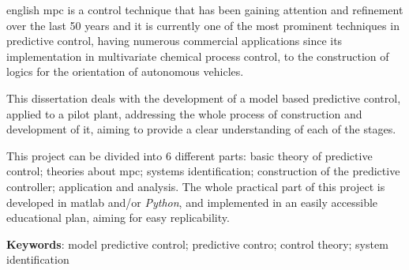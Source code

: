 \setlength{\absparsep}{18pt} %
\begin{resumo}[Abstract]
  \begin{otherlanguage*}{english}
    \acrshort{mpc} is a control technique that has been gaining attention and refinement over the last 50 years
    and it is currently one of the most prominent techniques in predictive control, having numerous
    commercial applications since its implementation in multivariate chemical process control,
    to the construction of logics for the orientation of autonomous vehicles.
    
    This dissertation deals with the development of a model based predictive control, applied
    to a pilot plant, addressing the whole process of construction and development of it,
    aiming to provide a clear understanding of each of the stages.
    
    This project can be divided into 6 different parts: basic theory of predictive control;
    theories about \acrshort{mpc}; systems identification; construction of the predictive controller;
    application and analysis. The whole practical part of this project is developed in \acrshort{matlab}
    and/or \textit{Python}, and implemented in an easily accessible educational plan, aiming for
    easy replicability.

    \vspace{\onelineskip}

    \noindent 
    \textbf{Keywords}: model predictive control; predictive contro; control theory; system identification
  \end{otherlanguage*}
\end{resumo}